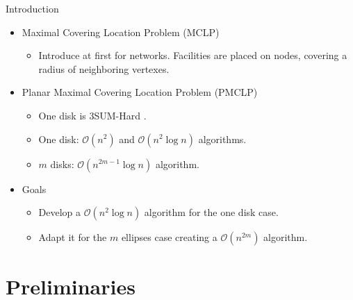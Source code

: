\documentclass{beamer}
\newcommand{\R}{\mathbb{R}}
\newcommand{\bigO}{\mathscr{O}}
\begin{document}
\begin{frame}{Introduction}
\begin{itemize}

	\item Maximal Covering Location Problem (MCLP)
	
	\begin{itemize}
		\item Introduce at first for networks. Facilities are placed on nodes, covering a radius of neighboring vertexes.
	\end{itemize}
	\item Planar Maximal Covering Location Problem (PMCLP)
	\begin{itemize}
		\item One disk is 3SUM-Hard \autocite{3SUM-kopelowitz:2014}.
		\item One disk: $\bigO(n^2)$ and $\bigO(n^2\log{n})$ algorithms.
		\item $m$ disks: $\bigO(n^{2m-1}\log{n})$ algorithm.
	\end{itemize}
	\item Goals
	\begin{itemize}
		\item Develop a $\bigO(n^2\log{n})$ algorithm for the one disk case.
		\item Adapt it for the $m$ ellipses case creating a $\bigO(n^{2m})$ algorithm.
	\end{itemize}
\end{itemize}

\end{frame} 




\section{Preliminaries}

	
%			
\end{document}
